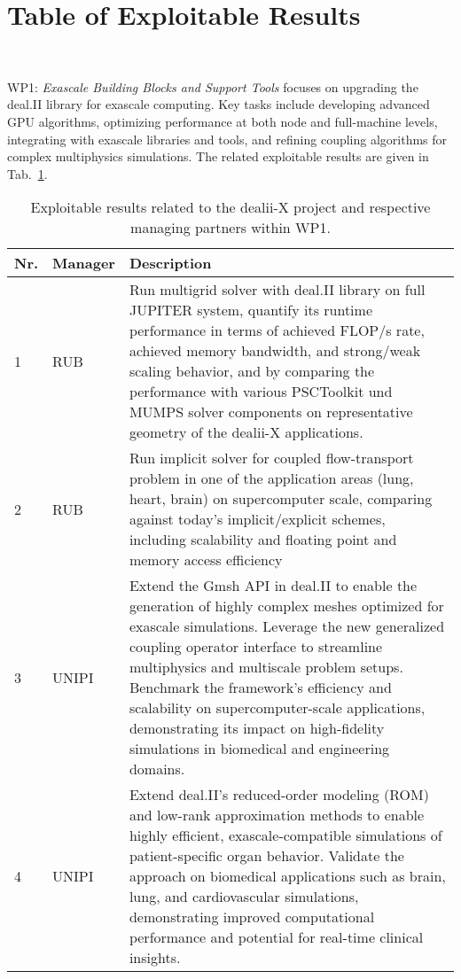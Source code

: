 \documentclass[a4paper,12pt]{article}
\begin{document}
\newpage

\section{{Table of Exploitable Results}}~\label{sec:table_exploitable_results}

WP1: \textit{Exascale Building Blocks and Support Tools} focuses on upgrading the deal.II library for exascale computing. Key tasks include developing advanced GPU algorithms, optimizing performance at both node and full-machine levels, integrating with exascale libraries and tools, and refining coupling algorithms for complex multiphysics simulations. The related exploitable results are given in Tab.~\ref{tab:exploitable_results_WP1}.

\begin{center}
    \small
    \renewcommand{\arraystretch}{1.25}
    \begin{longtable}{|l|p{2.5cm}|p{12cm}|}
    \caption{Exploitable results related to the dealii-X project and respective managing partners within WP1.}
    \label{tab:exploitable_results_WP1}
    \\
    \hline
    \textbf{Nr.} & \textbf{Manager} & \textbf{Description} \\
    \hline
    1 & RUB &
    Run multigrid solver with deal.II library on full JUPITER system,
    quantify its runtime performance in terms of achieved FLOP/s rate, 
    achieved memory bandwidth, and strong/weak scaling behavior, and
    by comparing the performance with various PSCToolkit und MUMPS
    solver components on representative geometry of the dealii-X applications.
    \\
    \hline
    2 & RUB &
    Run implicit solver for coupled flow-transport problem in one of the application areas (lung, heart, brain) on supercomputer scale, comparing against today's implicit/explicit schemes, including scalability and floating point and memory access efficiency 
    \\
    \hline
    3 & UNIPI &
    Extend the Gmsh API in deal.II to enable the generation of highly complex meshes optimized for exascale simulations. Leverage the new generalized coupling operator interface to streamline multiphysics and multiscale problem setups. Benchmark the framework’s efficiency and scalability on supercomputer-scale applications, demonstrating its impact on high-fidelity simulations in biomedical and engineering domains.
    \\
    \hline
    4 & UNIPI &
    Extend deal.II’s reduced-order modeling (ROM) and low-rank approximation methods to enable highly efficient, exascale-compatible simulations of patient-specific organ behavior. Validate the approach on biomedical applications such as brain, lung, and cardiovascular simulations, demonstrating improved computational performance and potential for real-time clinical insights. 

\end{longtable}
\end{center}
\end{document}
